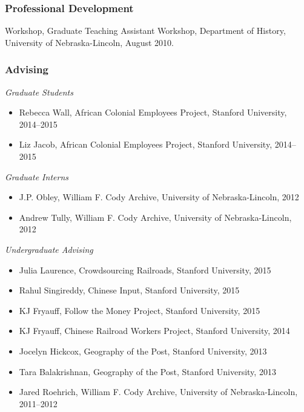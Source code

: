 \subsubsection{Professional
Development}\label{professional-development-1}

Workshop, Graduate Teaching Assistant Workshop, Department of History,
University of Nebraska-Lincoln, August 2010.

\subsubsection{Advising}\label{advising}

\emph{Graduate Students}

\begin{itemize}
\tightlist
\item
  Rebecca Wall, African Colonial Employees Project, Stanford University,
  2014--2015
\item
  Liz Jacob, African Colonial Employees Project, Stanford University,
  2014--2015
\end{itemize}

\emph{Graduate Interns}

\begin{itemize}
\tightlist
\item
  J.P. Obley, William F. Cody Archive, University of Nebraska-Lincoln,
  2012
\item
  Andrew Tully, William F. Cody Archive, University of Nebraska-Lincoln,
  2012
\end{itemize}

\emph{Undergraduate Advising}

\begin{itemize}
\tightlist
\item
  Julia Laurence, Crowdsourcing Railroads, Stanford University, 2015
\item
  Rahul Singireddy, Chinese Input, Stanford University, 2015
\item
  KJ Fryauff, Follow the Money Project, Stanford University, 2015
\item
  KJ Fryauff, Chinese Railroad Workers Project, Stanford University,
  2014
\item
  Jocelyn Hickcox, Geography of the Post, Stanford University, 2013
\item
  Tara Balakrishnan, Geography of the Post, Stanford University, 2013
\item
  Jared Roehrich, William F. Cody Archive, University of
  Nebraska-Lincoln, 2011--2012
\end{itemize}

